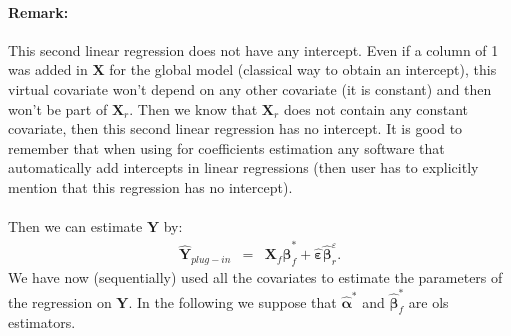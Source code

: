 \documentclass[12pt,a4paper]{report}
\begin{document}
\paragraph{Remark:} This second linear regression does not have any intercept. Even if a column of 1 was added in $\boldsymbol{X}$ for the global model (classical way to obtain an intercept), this virtual covariate won't depend on any other covariate (it is constant) and then won't be part of $\boldsymbol{X}_r$. Then we know that $\boldsymbol{X}_r$ does not contain any constant covariate, then this second linear regression has no intercept. It is good to remember that when using for coefficients estimation any software that automatically add intercepts in linear regressions (then user has to explicitly mention that this regression has no intercept). \\
\\
Then we can estimate $\boldsymbol{Y}$ by:
\begin{eqnarray}
	\hat{\boldsymbol{Y}}_{plug-in}&=&\boldsymbol{X}_f\hat{\boldsymbol{\beta}}^*_f + \hat{\boldsymbol{\varepsilon}}\hat{\boldsymbol{\beta}}_{r}^{\varepsilon}. \label{hatYplugin} 
\end{eqnarray}
 We have now (sequentially) used all the covariates to estimate the parameters of the regression on $\boldsymbol{Y}$. 	In the following we suppose that $\hat{\boldsymbol{\alpha}}^*$ and $\hat{\boldsymbol{\beta}}_f^*$ are {\sc ols} estimators. 
\\
\end{document}
